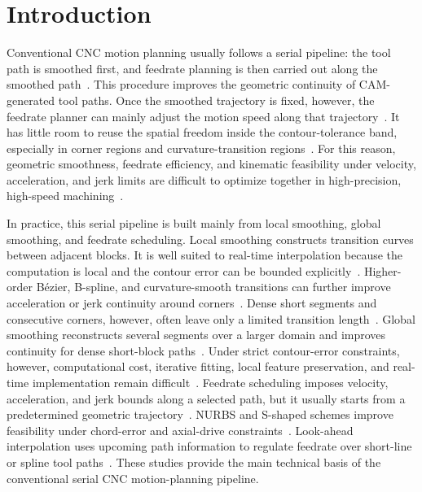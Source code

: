 \documentclass[preprint,12pt]{elsarticle}
\begin{document}
\section{Introduction}
\label{sec:introduction}
Conventional CNC motion planning usually follows a serial pipeline: the tool path is smoothed first, and feedrate planning is then carried out along the smoothed path~\cite{Sun2022,Yan2023}. This procedure improves the geometric continuity of CAM-generated tool paths. Once the smoothed trajectory is fixed, however, the feedrate planner can mainly adjust the motion speed along that trajectory~\cite{Erkorkmaz2001,Lee2011}. It has little room to reuse the spatial freedom inside the contour-tolerance band, especially in corner regions and curvature-transition regions~\cite{Sencer2015,Tajima2016}. For this reason, geometric smoothness, feedrate efficiency, and kinematic feasibility under velocity, acceleration, and jerk limits are difficult to optimize together in high-precision, high-speed machining~\cite{Sun2022,Zhang2021}.

In practice, this serial pipeline is built mainly from local smoothing, global smoothing, and feedrate scheduling. Local smoothing constructs transition curves between adjacent blocks. It is well suited to real-time interpolation because the computation is local and the contour error can be bounded explicitly~\cite{Hu2024}. Higher-order B\'ezier, B-spline, and curvature-smooth transitions can further improve acceleration or jerk continuity around corners~\cite{Fan2015,Zhang2018}. Dense short segments and consecutive corners, however, often leave only a limited transition length~\cite{Li2020}. Global smoothing reconstructs several segments over a larger domain and improves continuity for dense short-block paths~\cite{Song2021}. Under strict contour-error constraints, however, computational cost, iterative fitting, local feature preservation, and real-time implementation remain difficult~\cite{Yang2015}. Feedrate scheduling imposes velocity, acceleration, and jerk bounds along a selected path, but it usually starts from a predetermined geometric trajectory~\cite{Zhang2021}. NURBS and S-shaped schemes improve feasibility under chord-error and axial-drive constraints~\cite{Wu2022}. Look-ahead interpolation uses upcoming path information to regulate feedrate over short-line or spline tool paths~\cite{Tsai2010,Song2020}. These studies provide the main technical basis of the conventional serial CNC motion-planning pipeline.
\end{document}
